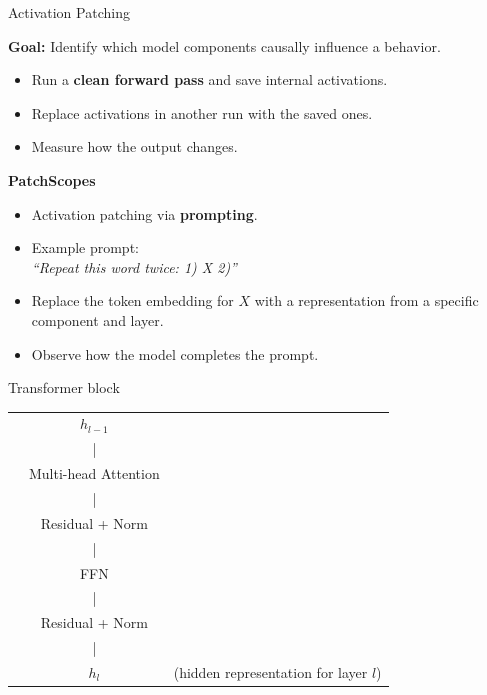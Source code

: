 \documentclass{beamer}
\begin{document}
\begin{frame}{Activation Patching}

\textbf{Goal:} Identify which model components causally influence a behavior.

\begin{itemize}
    \item Run a \textbf{clean forward pass} and save internal activations.
    \item Replace activations in another run with the saved ones.
    \item Measure how the output changes.
\end{itemize}

\begin{block}{\textbf{PatchScopes} \parencite{ghandeharioun2024}}
\begin{itemize}
    \item Activation patching via \textbf{prompting}.
    \item Example prompt: \\
    \textit{``Repeat this word twice: 1) X 2)''}
    \item Replace the token embedding for $X$ with a representation from a specific component and layer.
    \item Observe how the model completes the prompt.
\end{itemize}

\end{block}

\end{frame}

\begin{frame}{Transformer block}
\begin{tabular}{lcl}
& $h_{l-1}$ & \\
& | & \\
& Multi-head Attention & \\
& | & \\
& Residual + Norm & \\
& | & \\
& FFN & \\
& | & \\
& Residual + Norm & \\
& | & \\
& $h_l$ & (hidden representation for layer $l$)
\end{tabular}
\end{frame}
\end{document}
